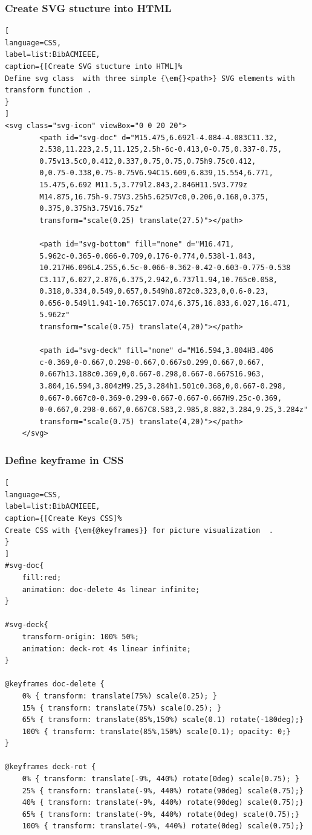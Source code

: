 \subsubsection {Create SVG stucture into HTML} %
\begin{lstlisting}[
language=CSS,
label=list:BibACMIEEE,
caption={[Create SVG stucture into HTML]%
Define svg class  with three simple {\em{}<path>} SVG elements with transform function .
}
]
<svg class="svg-icon" viewBox="0 0 20 20">
		<path id="svg-doc" d="M15.475,6.692l-4.084-4.083C11.32,
		2.538,11.223,2.5,11.125,2.5h-6c-0.413,0-0.75,0.337-0.75,
		0.75v13.5c0,0.412,0.337,0.75,0.75,0.75h9.75c0.412,
		0,0.75-0.338,0.75-0.75V6.94C15.609,6.839,15.554,6.771,
		15.475,6.692 M11.5,3.779l2.843,2.846H11.5V3.779z
		M14.875,16.75h-9.75V3.25h5.625V7c0,0.206,0.168,0.375,
		0.375,0.375h3.75V16.75z"
		transform="scale(0.25) translate(27.5)"></path>

		<path id="svg-bottom" fill="none" d="M16.471,
		5.962c-0.365-0.066-0.709,0.176-0.774,0.538l-1.843,
		10.217H6.096L4.255,6.5c-0.066-0.362-0.42-0.603-0.775-0.538
		C3.117,6.027,2.876,6.375,2.942,6.737l1.94,10.765c0.058,
		0.318,0.334,0.549,0.657,0.549h8.872c0.323,0,0.6-0.23,
		0.656-0.549l1.941-10.765C17.074,6.375,16.833,6.027,16.471,
		5.962z"
		transform="scale(0.75) translate(4,20)"></path>

		<path id="svg-deck" fill="none" d="M16.594,3.804H3.406
		c-0.369,0-0.667,0.298-0.667,0.667s0.299,0.667,0.667,
		0.667h13.188c0.369,0,0.667-0.298,0.667-0.667S16.963,
		3.804,16.594,3.804zM9.25,3.284h1.501c0.368,0,0.667-0.298,
		0.667-0.667c0-0.369-0.299-0.667-0.667-0.667H9.25c-0.369,
		0-0.667,0.298-0.667,0.667C8.583,2.985,8.882,3.284,9.25,3.284z"
		transform="scale(0.75) translate(4,20)"></path>
	</svg>

\end{lstlisting}
\label{list:SVGStuctureHTML}

\subsubsection {Define keyframe in CSS} %
\begin{lstlisting}[
language=CSS,
label=list:BibACMIEEE,
caption={[Create Keys CSS]%
Create CSS with {\em{@keyframes}} for picture visualization  .
}
]
#svg-doc{
	fill:red;
	animation: doc-delete 4s linear infinite;
}

#svg-deck{
	transform-origin: 100% 50%;
	animation: deck-rot 4s linear infinite;
}

@keyframes doc-delete {
	0% { transform: translate(75%) scale(0.25); }
	15% { transform: translate(75%) scale(0.25); }
	65% { transform: translate(85%,150%) scale(0.1) rotate(-180deg);}
	100% { transform: translate(85%,150%) scale(0.1); opacity: 0;}
}

@keyframes deck-rot {
	0% { transform: translate(-9%, 440%) rotate(0deg) scale(0.75); }
	25% { transform: translate(-9%, 440%) rotate(90deg) scale(0.75);}
	40% { transform: translate(-9%, 440%) rotate(90deg) scale(0.75);}
	65% { transform: translate(-9%, 440%) rotate(0deg) scale(0.75);}
	100% { transform: translate(-9%, 440%) rotate(0deg) scale(0.75);}

\end{lstlisting}
\label{list:Keys_CSS}

